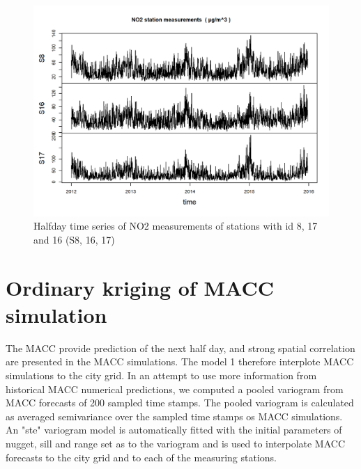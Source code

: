 \documentclass{article}
\begin{document}
\begin{figure}[tbp]
  \center
\includegraphics[scale = .8]{sample.png}
\caption{Halfday time series of NO2 measurements of stations with id 8, 17 and 16 (S8, 16, 17)}
\label{fig:sample}
\end{figure}

\section{Ordinary kriging of MACC simulation} 
 
The MACC provide prediction of the next half day, and strong spatial correlation are presented in the MACC simulations. The model 1 therefore interplote  MACC simulations to the city grid. In an attempt to use more information from historical MACC numerical predictions, we computed a pooled variogram  from MACC forecasts of 200 sampled time stamps. The pooled variogram is calculated as averaged semivariance over the sampled time stamps os MACC simulations. An "ste" variogram model \citet[Matern, M. Stein’s parameterization,][]{automap} is automatically fitted with the initial parameters of nugget, sill and range set as \citet{automap} to the variogram and is used to interpolate MACC forecasts to the city grid and to each of the measuring stations.
 
\end{document}
